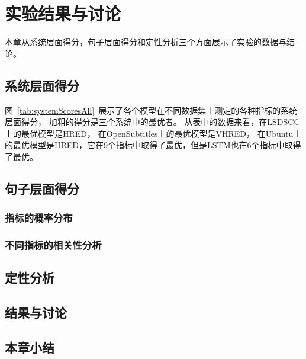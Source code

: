 
\chapter{实验结果与讨论}\label{ch:experiment}
本章从系统层面得分，句子层面得分和定性分析三个方面展示了实验的数据与结论。

\section{系统层面得分}\label{sec:system_scores}
图~\ref{tab:systemScoresAll}~展示了各个模型在不同数据集上测定的各种指标的系统层面得分，
加粗的得分是三个系统中的最优者。
从表中的数据来看，在LSDSCC上的最优模型是HRED，
在OpenSubtitles上的最优模型是VHRED，
在Ubuntu上的最优模型是HRED，它在9个指标中取得了最优，但是LSTM也在6个指标中取得了最优。



\section{句子层面得分}\label{sec:utterance_scores}
\subsection{指标的概率分布}\label{subsec:metric_distribution}

\subsection{不同指标的相关性分析}\label{subsec:metric_correlation}

\section{定性分析}\label{sec:qualitative_analysis}

\section{结果与讨论}\label{sec:result_and_discussion}

\section{本章小结}\label{sec:experiment_conclusion}
